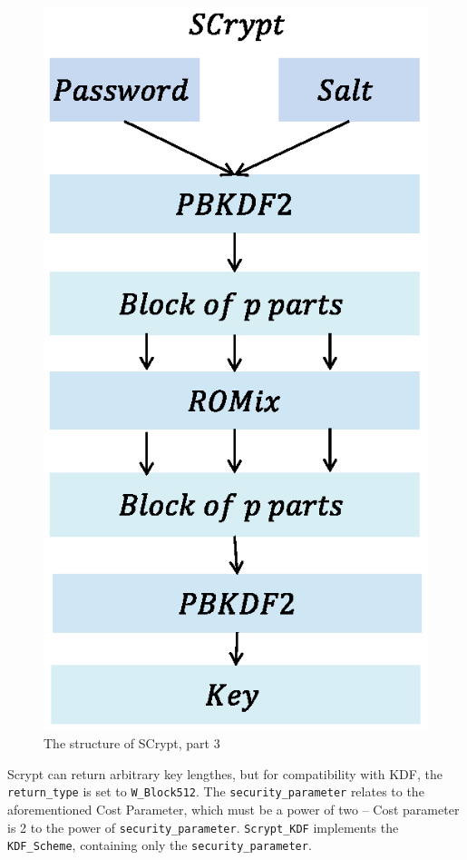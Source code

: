 \begin{figure}[ht!]
\centering
\includegraphics[width=150mm]{./images/Scryptc}
\caption{The structure of SCrypt, part 3}
\end{figure}

Scrypt can return arbitrary key lengthes, but for compatibility with KDF, the \texttt{return\_type} is set to \texttt{W\_Block512}. The \texttt{security\_parameter} relates to the aforementioned Cost Parameter, which must be a power of two – Cost parameter is 2 to the power of \texttt{security\_parameter}.  \texttt{Scrypt\_KDF} implements the \texttt{KDF\_Scheme}, containing only the \texttt{security\_parameter}.


